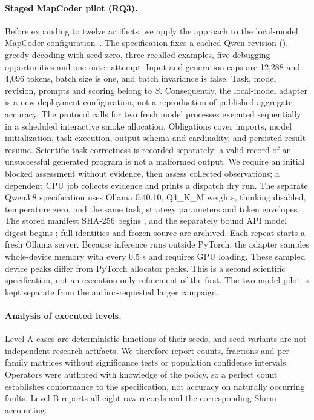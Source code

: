 \paragraph{Staged MapCoder pilot (RQ3).} Before expanding to twelve artifacts, we apply the approach to the local-model MapCoder configuration~\cite{resaiartifact7}. The specification fixes a cached Qwen revision (), greedy decoding with seed zero, three recalled examples, five debugging opportunities and one outer attempt. Input and generation caps are 12,288 and 4,096 tokens, batch size is one, and batch invariance is false. Task, model revision, prompts and scoring belong to $S$. Consequently, the local-model adapter is a new deployment configuration, not a reproduction of published aggregate accuracy. The protocol calls for two fresh model processes executed sequentially in a scheduled interactive smoke allocation. Obligations cover imports, model initialization, task execution, output schema and cardinality, and persisted-result resume. Scientific task correctness is recorded separately: a valid record of an unsuccessful generated program is not a malformed output. We require an initial blocked assessment without evidence, then assess collected observations; a dependent CPU job collects evidence and prints a dispatch dry run. The separate Qwen3.8 specification uses Ollama 0.40.10, Q4\_K\_M weights, thinking disabled, temperature zero, and the same task, strategy parameters and token envelopes. The stored manifest SHA-256 begins , and the separately bound API model digest begins ; full identities and frozen source are archived. Each repeat starts a fresh Ollama server. Because inference runs outside PyTorch, the adapter samples whole-device memory with  every 0.5 s and requires GPU loading. These sampled device peaks differ from PyTorch allocator peaks. This is a second scientific specification, not an execution-only refinement of the first. The two-model pilot is kept separate from the author-requested larger campaign.

\paragraph{Analysis of executed levels.} Level A cases are deterministic functions of their seeds, and seed variants are not independent research artifacts. We therefore report counts, fractions and per-family matrices without significance tests or population confidence intervals. Operators were authored with knowledge of the policy, so a perfect count establishes conformance to the specification, not accuracy on naturally occurring faults. Level B reports all eight raw records and the corresponding Slurm accounting.


